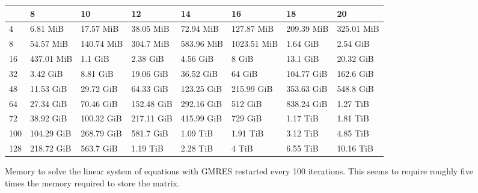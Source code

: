 \begin{sidewaysfigure}
  \centering
  \caption{Memory to solve the linear system of equations with GMRES restarted
every 100 iterations. This seems to require roughly five times the memory required
to store the matrix.}
  \begin{tabular}{llllllll}
  \toprule
  {} &          8  &          10 &          12 &          14 &           16 &          18 &          20 \\
  \midrule
  4   &    6.81 MiB &   17.57 MiB &   38.05 MiB &   72.94 MiB &   127.87 MiB &  209.39 MiB &  325.01 MiB \\
  8   &   54.57 MiB &  140.74 MiB &   304.7 MiB &  583.96 MiB &  1023.51 MiB &    1.64 GiB &    2.54 GiB \\
  16  &  437.01 MiB &     1.1 GiB &    2.38 GiB &    4.56 GiB &        8 GiB &    13.1 GiB &   20.32 GiB \\
  32  &    3.42 GiB &    8.81 GiB &   19.06 GiB &   36.52 GiB &       64 GiB &  104.77 GiB &   162.6 GiB \\
  48  &   11.53 GiB &   29.72 GiB &   64.33 GiB &  123.25 GiB &   215.99 GiB &  353.63 GiB &   548.8 GiB \\
  64  &   27.34 GiB &   70.46 GiB &  152.48 GiB &  292.16 GiB &      512 GiB &  838.24 GiB &    1.27 TiB \\
  72  &   38.92 GiB &  100.32 GiB &  217.11 GiB &  415.99 GiB &      729 GiB &    1.17 TiB &    1.81 TiB \\
  100 &  104.29 GiB &  268.79 GiB &   581.7 GiB &    1.09 TiB &     1.91 TiB &    3.12 TiB &    4.85 TiB \\
  128 &  218.72 GiB &   563.7 GiB &    1.19 TiB &    2.28 TiB &        4 TiB &    6.55 TiB &   10.16 TiB \\
  \bottomrule
  \end{tabular}
\end{sidewaysfigure}
